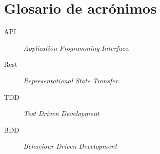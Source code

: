 \chapter{Glosario de acrónimos}
\label{chap:glosario-acronimos}


\begin{description}
 \item [API] \emph{Application Programming Interface}.
 \item [Rest] \emph{Representational State Transfer}.
 \item [TDD] \emph{Test Driven Development}
 \item [BDD] \emph{Behaviour Driven Development}
\end{description}


